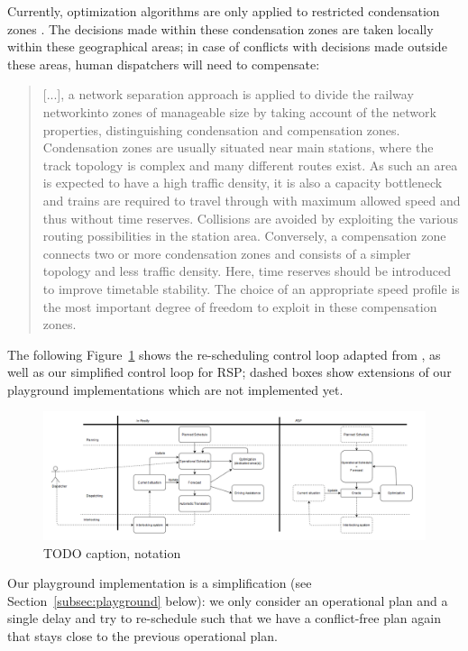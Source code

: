 \documentclass{article}
\begin{document}
Currently, optimization algorithms are only applied to restricted condensation zones \cite{caimi2009}. The decisions made within these condensation zones are taken locally within these geographical areas; in case of conflicts with decisions made outside these areas, human dispatchers will need to compensate:
%
\begin{quote}
    [...], a network separation approach is applied to divide the railway networkinto zones of manageable size by taking account of the network properties, distinguishing condensation and compensation zones. Condensation zones are usually situated near main stations, where the track topology is complex and many different routes exist. As such an area is expected to have a high traffic density, it is also a capacity bottleneck and trains are required to travel through with maximum allowed speed and thus without time reserves. Collisions are avoided by exploiting the various routing possibilities in the station area. Conversely, a compensation zone connects two or more condensation zones and consists of a simpler topology and less traffic density. Here, time reserves should be introduced to improve timetable stability. The choice of an appropriate speed profile is the most important degree of freedom to exploit in these compensation zones. \cite{caimi2009}
\end{quote}

The following Figure~\ref{fig:introduction_operations} shows the re-scheduling control loop adapted from \cite{rcsbrochure,rcswhitepaper}, as well as our simplified control loop for RSP; dashed boxes show extensions of our playground implementations which are not implemented yet.
\begin{figure}[hbtp]
	\centering
  \includegraphics[width=1.0\textwidth]{introduction_operations.PNG}
	\caption{TODO caption, notation}
	\label{fig:introduction_operations}
\end{figure}

Our playground implementation is a simplification (see Section~\ref{subsec:playground} below): we only consider an operational plan and a single delay and try to re-schedule such that we have a conflict-free plan again that stays close to the previous operational plan.
\end{document}
